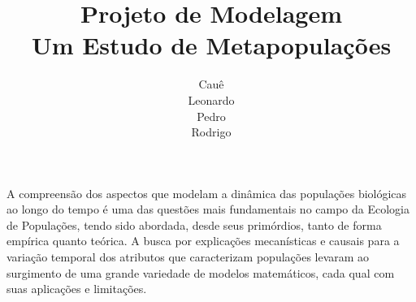 \documentclass[12pt, a4paper]{report}
\begin{document}
	\title{
		Projeto de Modelagem \\
		\bigskip 
		Um Estudo de Metapopulações
	}
	
	\author{
		Cauê	\\
		Leonardo	\\
		Pedro	\\
		Rodrigo	\\	
	}

	
	\maketitle

	A compreensão dos aspectos que modelam a dinâmica das populações biológicas ao longo do tempo é uma das questões mais fundamentais no campo da Ecologia de Populações, tendo sido abordada, desde seus primórdios, tanto de forma empírica quanto teórica. A busca por explicações mecanísticas e causais para a variação temporal dos atributos que caracterizam populações levaram ao surgimento de uma grande variedade de modelos matemáticos, cada qual com suas aplicações e limitações.
\end{document}
